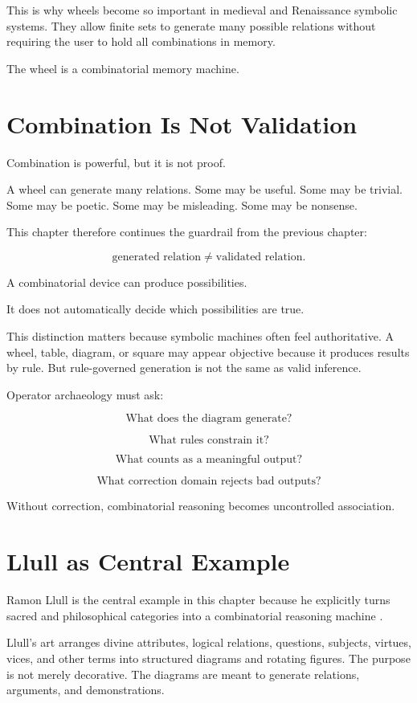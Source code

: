 \documentclass[11pt]{book}
\begin{document}
This is why wheels become so important in medieval and Renaissance symbolic systems. They allow finite sets to generate many possible relations without requiring the user to hold all combinations in memory.

The wheel is a combinatorial memory machine.

\section{Combination Is Not Validation}

Combination is powerful, but it is not proof.

A wheel can generate many relations. Some may be useful. Some may be trivial. Some may be poetic. Some may be misleading. Some may be nonsense.

This chapter therefore continues the guardrail from the previous chapter:

\[
\text{generated relation} \neq \text{validated relation}.
\]

A combinatorial device can produce possibilities.

It does not automatically decide which possibilities are true.

This distinction matters because symbolic machines often feel authoritative. A wheel, table, diagram, or square may appear objective because it produces results by rule. But rule-governed generation is not the same as valid inference.

Operator archaeology must ask:

\[
\text{What does the diagram generate?}
\]

\[
\text{What rules constrain it?}
\]

\[
\text{What counts as a meaningful output?}
\]

\[
\text{What correction domain rejects bad outputs?}
\]

Without correction, combinatorial reasoning becomes uncontrolled association.

\section{Llull as Central Example}

Ramon Llull is the central example in this chapter because he explicitly turns sacred and philosophical categories into a combinatorial reasoning machine \cite{Yates1966ArtMemory,Yates1964GiordanoBruno,LlullBonner1985SelectedWorks}.

Llull's art arranges divine attributes, logical relations, questions, subjects, virtues, vices, and other terms into structured diagrams and rotating figures. The purpose is not merely decorative. The diagrams are meant to generate relations, arguments, and demonstrations.
\end{document}
